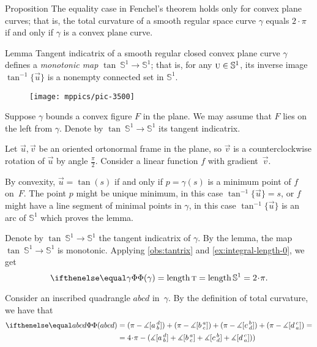 \begin{thm}{Proposition}\label{prop:fenchel=}
The equality case in Fenchel's theorem holds only for convex plane curves;
that is, the total curvature of a smooth regular space curve $\gamma$ equals $2\cdot\pi$ if and only if $\gamma$ is a convex plane curve.
\end{thm}

\begin{thm}{Lemma}\label{prop:convex-monotone}
Tangent indicatrix of a smooth regular closed convex plane curve $\gamma$ defines a \emph{monotonic map}  $\tan\:\mathbb{S}^1\to \mathbb{S}^1$;
that is, for any $\vec u\z\in\mathbb{S}^1$, its inverse image $\tan^{-1}\{\vec u\}$ is a nonempty connected set in $\mathbb{S}^1$.
\end{thm}

\begin{wrapfigure}{r}{25 mm}
\vskip-0mm
\centering
\texttt{[image: mppics/pic-3500]}
\vskip0mm
\end{wrapfigure}

Suppose $\gamma$ bounds a convex figure $F$ in the plane.
We may assume that $F$ lies on the left from $\gamma$.
Denote by $\tan\:\mathbb{S}^1\to \mathbb{S}^1$ its tangent indicatrix.

Let $\vec u, \vec v$ be an oriented ortonormal frame in the plane,
so $\vec v$ is a counterclockwise rotation of $\vec u$ by angle $\tfrac\pi2$.
Consider a linear function $f$ with gradient~$\vec v$.

By convexity,  $\vec u=\tan(s)$ if and only if $p=\gamma(s)$ is a minimum point of $f$ on~$F$.
The point $p$ might be unique minimum, in this case $\tan^{-1}\{\vec u\}=s$,
or $f$ might have a line segment of minimal points in $\gamma$, in this case $\tan^{-1}\{\vec u\}$ is an arc of $\mathbb{S}^1$ which proves the lemma.
\qeds


Denote by $\tan\:\mathbb{S}^1\to \mathbb{S}^1$ the tangent indicatrix of $\gamma$.
By the lemma, the map $\tan\:\mathbb{S}^1\to \mathbb{S}^1$ is monotonic.
Applying \ref{obs:tantrix} and \ref{ex:integral-length-0}, we get
\[\tc\gamma=\length\tan=\length\mathbb{S}^1=2\cdot \pi.\]

Consider an inscribed quadrangle $abcd$ in~$\gamma$.
By the definition of total curvature, we have that
\begin{align*}
\tc{abcd}&=(\pi-
\measuredangle\hinge adb)+(\pi-
\measuredangle\hinge bac)+(\pi-
\measuredangle\hinge cbd)+(\pi-
\measuredangle\hinge dca)=
\\
&=4\cdot\pi -(
\measuredangle\hinge adb
+
\measuredangle\hinge bac
+
\measuredangle\hinge cbd
+
\measuredangle\hinge dca))
\end{align*}


